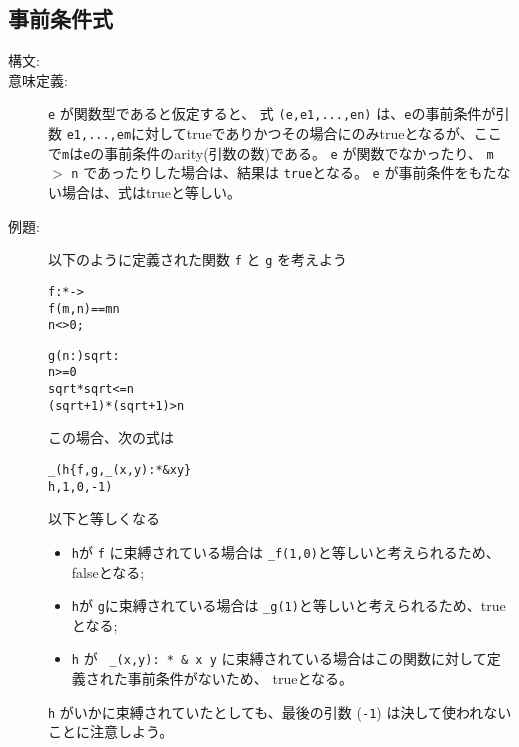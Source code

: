 \documentclass[\pformat,12pt]{jarticle}
\begin{document}
\subsection{事前条件式}
\begin{description}
\item[構文:]
  
\item[意味定義:] 
 \texttt{e} が関数型であると仮定すると、 式 \texttt{(e,e1,...,en)} は、\texttt{e}の事前条件が引数 \texttt{e1,...,em}に対してtrueでありかつその場合にのみtrueとなるが、ここで\texttt{m}は\texttt{e}の事前条件のarity(引数の数)である。
 \texttt{e} が関数でなかったり、 \texttt{m} $>$ \texttt{n} であったりした場合は、結果は \texttt{true}となる。
 \texttt{e} が事前条件をもたない場合は、式はtrueと等しい。
\item[例題:] 
  以下のように定義された関数 \texttt{f} と \texttt{g} を考えよう
  \begin{alltt}
  f :  *  -> 
  f(m,n) == m  n
   n <> 0;

  g (n: ) sqrt:
   n >= 0
   sqrt * sqrt <= n 
       (sqrt+1) * (sqrt+1) > n
  \end{alltt}
この場合、次の式は
  \begin{alltt}
  \_( h  \{f,g, \_(x,y): *  & x  y\} 
        h, 1,0,-1)
  \end{alltt}  
以下と等しくなる
  \begin{itemize}
  \item \texttt{h}が \texttt{f} に束縛されている場合は \texttt{\_f(1,0)}と等しいと考えられるため、falseとなる;
  \item \texttt{h}が \texttt{g}に束縛されている場合は \texttt{\_g(1)}と等しいと考えられるため、trueとなる;
  \item  \texttt{h} が \texttt{ \_(x,y): *  \& x  y} に束縛されている場合はこの関数に対して定義された事前条件がないため、 trueとなる。
  \end{itemize}
 \texttt{h} がいかに束縛されていたとしても、最後の引数  (\texttt{-1}) は決して使われないことに注意しよう。
\end{description}
\end{document}
